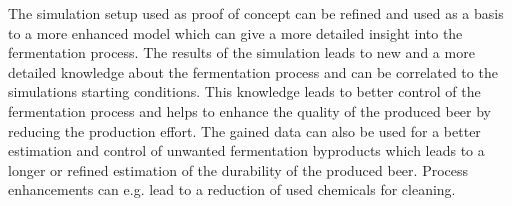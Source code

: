 The simulation setup used as proof of concept can be refined and used as a basis to a more enhanced model which can give a more detailed
insight into the fermentation process. The results of the simulation leads to new and a more detailed knowledge about the fermentation
process and can be correlated to the simulations starting conditions. This knowledge leads to better control of the fermentation process
and helps to enhance the quality of the produced beer by reducing the production effort. The gained data can also be used for a better
estimation and control of unwanted fermentation byproducts which leads to a longer or refined estimation of the durability of the produced
beer. Process enhancements can e.g. lead to a reduction of used chemicals for cleaning.


